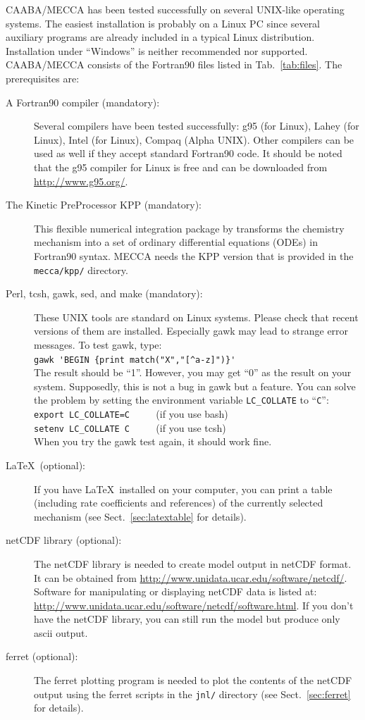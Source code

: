 \documentclass[twoside]{article}
\begin{document}
CAABA/MECCA has been tested successfully on several UNIX-like operating
systems. The easiest installation is probably on a Linux PC since
several auxiliary programs are already included in a typical Linux
distribution. Installation under ``Windows'' is neither recommended nor
supported. CAABA/MECCA consists of the Fortran90 files listed in
Tab.~\ref{tab:files}. The prerequisites are:
\begin{description}
\item[A Fortran90 compiler (mandatory):] Several compilers have been
  tested successfully: g95 (for Linux), Lahey (for Linux), Intel (for
  Linux), Compaq (Alpha UNIX). Other compilers can be used as well if
  they accept standard Fortran90 code. It should be noted that the g95
  compiler for Linux is free and can be downloaded from
  \url{http://www.g95.org/}.
\item[The Kinetic PreProcessor KPP (mandatory):] This flexible numerical
  integration package by \citet{1665} transforms the chemistry mechanism
  into a set of ordinary differential equations (ODEs) in Fortran90
  syntax. MECCA needs the KPP version that is provided in the
  \verb|mecca/kpp/| directory.
\item[Perl, tcsh, gawk, sed, and make (mandatory):] These UNIX tools are
  standard on Linux systems. Please check that recent versions of them
  are installed. Especially gawk may lead to strange error messages.
  To test gawk, type:\\
  \verb|gawk 'BEGIN {print match("X","[^a-z]")}'|\\
  The result should be ``1''. However, you may get ``0'' as the result
  on your system. Supposedly, this is not a bug in gawk but a feature.
  You can solve the problem by setting the environment variable
  \verb|LC_COLLATE| to ``\verb|C|'':\\
  \verb|export LC_COLLATE=C| $\qquad$ (if you use bash)\\
  \verb|setenv LC_COLLATE C| $\qquad$ (if you use tcsh)\\
  When you try the gawk test again, it should work fine.
\item[La\TeX\ (optional):] If you have La\TeX\ installed on your
  computer, you can print a table (including rate coefficients and
  references) of the currently selected mechanism (see
  Sect.~\ref{sec:latextable} for details).
\item[netCDF library (optional):] The netCDF library is needed to create
  model output in netCDF format. It can be obtained from
  \url{http://www.unidata.ucar.edu/software/netcdf/}. Software for
  manipulating or displaying netCDF data is listed at:
  \url{http://www.unidata.ucar.edu/software/netcdf/software.html}. If
  you don't have the netCDF library, you can still run the model but
  produce only ascii output.
\item[ferret (optional):] The ferret plotting program is needed to plot
  the contents of the netCDF output using the ferret scripts in the
  \verb|jnl/| directory (see Sect.~\ref{sec:ferret} for details).
\end{description}
\end{document}
